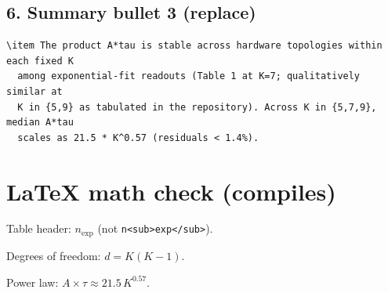 \documentclass[11pt]{article}
\begin{document}
\subsection*{6. Summary bullet 3 (replace)}

\begin{verbatim}
\item The product A*tau is stable across hardware topologies within each fixed K
  among exponential-fit readouts (Table 1 at K=7; qualitatively similar at
  K in {5,9} as tabulated in the repository). Across K in {5,7,9}, median A*tau
  scales as 21.5 * K^0.57 (residuals < 1.4%).
\end{verbatim}

\section*{LaTeX math check (compiles)}
Table header: $n_{\mathrm{exp}}$ \quad (not \verb|n<sub>exp</sub>|).

Degrees of freedom: $d = K(K-1)$.

Power law: $A\times\tau \approx 21.5\,K^{0.57}$.
\end{document}
